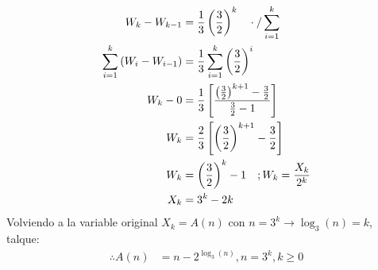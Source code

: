 \begin{solution}
\begin{align*}
    W_k - W_{k-1} &= \frac{1}{3}\left(\frac{3}{2}\right)^k \quad \cdot\text{/}\sum\limits_{i=1}^{k}\\
    \sum\limits_{i=1}^{k}\left(W_i - W_{i-1}\right)&=\frac{1}{3}\sum\limits_{i=1}^{k}\left(\frac{3}{2}\right)^i\\
    W_k - 0 &= \frac{1}{3} \left[ \frac{\left(\frac{3}{2}\right)^{k+1} -\frac{3}{2}}{\frac{3}{2}-1} \right]\\
    W_k &= \frac{2}{3} \left[ \left(\frac{3}{2}\right)^{k+1} - \frac{3}{2} \right]\\
    W_k &= \left( \frac{3}{2} \right)^k -1 \quad; W_k = \frac{X_k}{2^k}\\
    X_k &= 3^k - 2k
\end{align*}
Volviendo a la variable original $X_k=A(n)$ con $n=3^k \xrightarrow{} \log_3(n)=k$, talque:
\begin{align*}
    \therefore A(n) &= n -2^{\log_3(n)}, n=3^k,k \ge 0
\end{align*}
\end{solution}